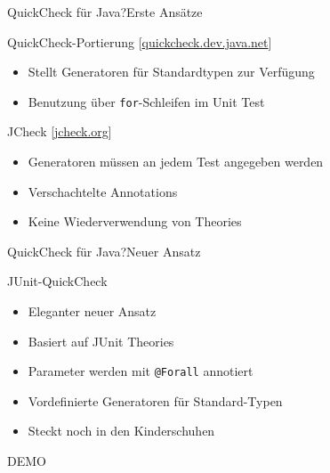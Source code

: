 \begin{frame}{QuickCheck für Java?}{Erste Ansätze}
	\begin{block}{QuickCheck-Portierung [\href{https://quickcheck.dev.java.net/}{quickcheck.dev.java.net}]}
	\begin{itemize}
		\item Stellt Generatoren für Standardtypen zur Verfügung
		\item Benutzung über \texttt{for}-Schleifen im Unit Test
	\end{itemize}
	\end{block}
	\pause
	\begin{block}{JCheck [\href{http://www.jcheck.org/}{jcheck.org}]}
	\begin{itemize}
		\item Generatoren müssen an jedem Test angegeben werden
		\item Verschachtelte Annotations
		\item Keine Wiederverwendung von Theories
	\end{itemize}
	\end{block}
\end{frame}
\begin{frame}{QuickCheck für Java?}{Neuer Ansatz}
	\begin{block}{JUnit-QuickCheck}
	\begin{itemize}
		\item Eleganter neuer Ansatz
		\item Basiert auf JUnit Theories
		\item Parameter werden mit \texttt{@Forall} annotiert
		\item Vordefinierte Generatoren für Standard-Typen
		\item Steckt noch in den Kinderschuhen
	\end{itemize}
	\end{block}
\end{frame}

\begin{frame}{}
\begin{center}
DEMO
\end{center}
\end{frame}


